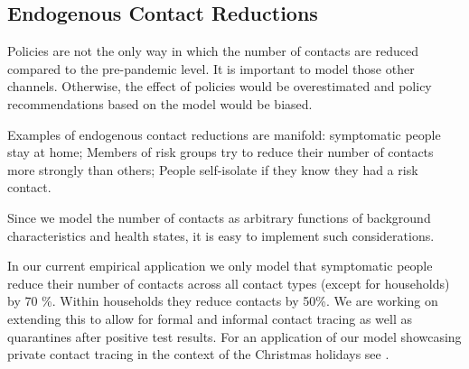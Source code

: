 \subsection{Endogenous Contact Reductions}
\label{sec:endogenous_contact_reductions}

Policies are not the only way in which the number of contacts are reduced compared to
the pre-pandemic level. It is important to model those other channels. Otherwise, the
effect of policies would be overestimated and policy recommendations based on the model
would be biased.

Examples of endogenous contact reductions are manifold: symptomatic people stay at home;
Members of risk groups try to reduce their number of contacts more strongly than others;
People self-isolate if they know they had a risk contact.

Since we model the number of contacts as arbitrary functions of background
characteristics and health states, it is easy to implement such considerations.

In our current empirical application we only model that symptomatic people reduce their
number of contacts across all contact types (except for households) by 70 \%. Within
households they reduce contacts by 50\%. We are working on extending this to allow for
formal and informal contact tracing as well as quarantines after positive test results.
For an application of our model showcasing private contact tracing in the context of the
Christmas holidays see \cite{Gabler2020}.
